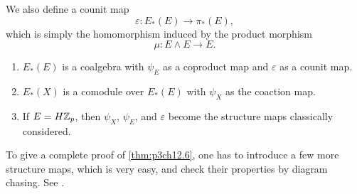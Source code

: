 \documentclass[../main]{subfiles}
\begin{document}
We also define a counit map
\[ \varepsilon\colon E_\ast(E)\longrightarrow\pi_\ast(E) , \]
which is simply the homomorphism induced by the product morphism
\[ \mu\colon E\wedge E\longrightarrow E . \]

\begin{theorem} \label{thm:p3ch12.6}

\begin{enumerate}
    \item $E_\ast(E)$ is a coalgebra with $\psi_E$ as a coproduct map and $\varepsilon$ as a counit map.
    \item $E_\ast(X)$ is a comodule over $E_\ast(E)$ with $\psi_X$ as the coaction map.
    \item If $E=H\mathbb{Z}_p$, then $\psi_X$, $\psi_E$, and $\varepsilon$ become the structure maps classically considered.
\end{enumerate}

To give a complete proof of \ref{thm:p3ch12.6}, one has to introduce a few more structure maps, which is very easy, and check their properties by diagram chasing. See .

\end{theorem}
\end{document}
